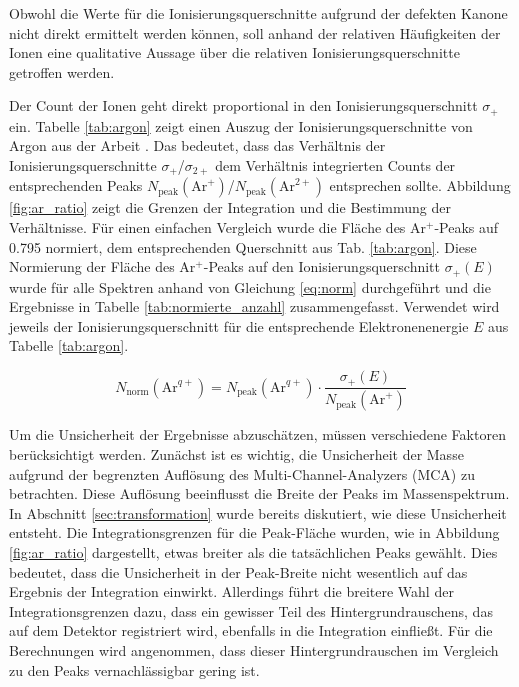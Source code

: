 Obwohl die Werte für die Ionisierungsquerschnitte aufgrund der defekten Kanone nicht direkt ermittelt werden können, soll anhand der relativen Häufigkeiten der Ionen eine qualitative Aussage über die relativen Ionisierungsquerschnitte getroffen werden. 

Der Count der Ionen geht direkt proportional in den Ionisierungsquerschnitt $\sigma_+$ ein. Tabelle \ref{tab:argon} zeigt einen Auszug der Ionisierungsquerschnitte von Argon aus der Arbeit \cite{Straub}. Das bedeutet, dass das Verhältnis der Ionisierungsquerschnitte $\sigma_+$/$\sigma_{2+}$ dem Verhältnis integrierten Counts der entsprechenden Peaks $N_\text{peak}(\text{Ar}^+)$/$N_\text{peak}(\text{Ar}^{2+})$ entsprechen sollte. Abbildung \ref{fig:ar_ratio} zeigt die Grenzen der Integration und die Bestimmung der Verhältnisse. Für einen einfachen Vergleich wurde die Fläche des Ar$^+$-Peaks auf 0.795 normiert, dem entsprechenden Querschnitt aus Tab. \ref{tab:argon}.
Diese Normierung der Fläche des Ar$^{+}$-Peaks auf den Ionisierungsquerschnitt $\sigma_+(E)$ wurde für alle Spektren anhand von Gleichung \ref{eq:norm} durchgeführt und die Ergebnisse in Tabelle \ref{tab:normierte_anzahl} zusammengefasst. Verwendet wird jeweils der Ionisierungsquerschnitt für die entsprechende Elektronenenergie $E$ aus Tabelle \ref{tab:argon}.

\begin{equation}
    \label{eq:norm}
    N_{\text{norm}}(\text{Ar}^{q+}) = N_\text{peak}(\text{Ar}^{q+}) \cdot \frac{\sigma_{+}(E)}{N_\text{peak}(\text{Ar}^{+})}
\end{equation}

Um die Unsicherheit der Ergebnisse abzuschätzen, müssen verschiedene Faktoren berücksichtigt werden. Zunächst ist es wichtig, die Unsicherheit der Masse aufgrund der begrenzten Auflösung des Multi-Channel-Analyzers (MCA) zu betrachten. Diese Auflösung beeinflusst die Breite der Peaks im Massenspektrum. In Abschnitt \ref{sec:transformation} wurde bereits diskutiert, wie diese Unsicherheit entsteht. Die Integrationsgrenzen für die Peak-Fläche wurden, wie in Abbildung \ref{fig:ar_ratio} dargestellt, etwas breiter als die tatsächlichen Peaks gewählt. Dies bedeutet, dass die Unsicherheit in der Peak-Breite nicht wesentlich auf das Ergebnis der Integration einwirkt. Allerdings führt die breitere Wahl der Integrationsgrenzen dazu, dass ein gewisser Teil des Hintergrundrauschens, das auf dem Detektor registriert wird, ebenfalls in die Integration einfließt. Für die Berechnungen wird angenommen, dass dieser Hintergrundrauschen im Vergleich zu den Peaks vernachlässigbar gering ist.

